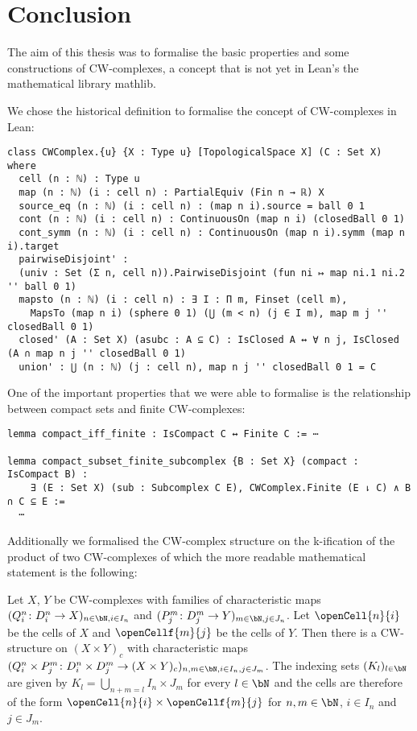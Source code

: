 \chapter*{Conclusion}

The aim of this thesis was to formalise the basic properties and some constructions of CW-complexes, a concept that is not yet in Lean's the mathematical library mathlib. 

We chose the historical definition to formalise the concept of CW-complexes in Lean: 

\begin{lstlisting}
class CWComplex.{u} {X : Type u} [TopologicalSpace X] (C : Set X) where
  cell (n : ℕ) : Type u
  map (n : ℕ) (i : cell n) : PartialEquiv (Fin n → ℝ) X
  source_eq (n : ℕ) (i : cell n) : (map n i).source = ball 0 1
  cont (n : ℕ) (i : cell n) : ContinuousOn (map n i) (closedBall 0 1)
  cont_symm (n : ℕ) (i : cell n) : ContinuousOn (map n i).symm (map n i).target
  pairwiseDisjoint' :
  (univ : Set (Σ n, cell n)).PairwiseDisjoint (fun ni ↦ map ni.1 ni.2 '' ball 0 1)
  mapsto (n : ℕ) (i : cell n) : ∃ I : Π m, Finset (cell m),
    MapsTo (map n i) (sphere 0 1) (⋃ (m < n) (j ∈ I m), map m j '' closedBall 0 1)
  closed' (A : Set X) (asubc : A ⊆ C) : IsClosed A ↔ ∀ n j, IsClosed (A ∩ map n j '' closedBall 0 1)
  union' : ⋃ (n : ℕ) (j : cell n), map n j '' closedBall 0 1 = C
\end{lstlisting}

One of the important properties that we were able to formalise is the relationship between compact sets and finite CW-complexes: 

\begin{lstlisting}
lemma compact_iff_finite : IsCompact C ↔ Finite C := ⋯

lemma compact_subset_finite_subcomplex {B : Set X} (compact : IsCompact B) :
    ∃ (E : Set X) (sub : Subcomplex C E), CWComplex.Finite (E ⇂ C) ∧ B ∩ C ⊆ E := 
  ⋯
\end{lstlisting}

Additionally we formalised the CW-complex structure on the k-ification of the product of two CW-complexes of which the more readable mathematical statement is the following: 

\begin{thm*}
    Let $X$, $Y$ be CW-complexes with families of characteristic maps $(Q_i^n \colon D_i^n \to X)_{n \in \bN, i \in I_n}$ and $(P_j^m \colon D_j^m \to Y)_{m \in \bN, j \in J_n}$. 
    Let $\openCell{n}{i}$ be the cells of $X$ and $\openCellf{m}{j}$ be the cells of $Y$.
    Then there is a CW-structure on $(X \times Y)_c$ with characteristic maps $(Q_i^n \times P_j^m \colon D_i^n \times D_j^m \to (X \times Y)_c)_{n,m \in \bN,i \in I_n,j \in J_m}$.
    The indexing sets $(K_l)_{l \in \bN}$ are given by $K_l = \bigcup_{n + m = l}I_n \times J_m$ for every $l \in \bN$ and the cells are therefore of the form $\openCell{n}{i} \times \openCellf{m}{j}$ for $n, m \in \bN$, $i \in I_n$ and $j \in J_m$.
\end{thm*}

